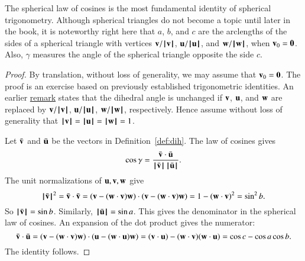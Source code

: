 The spherical law of cosines is the most fundamental identity of spherical trigonometry.    Although  spherical
triangles do not become a topic until later in the book, it is noteworthy right here that $a$, $b$, and $c$ are
the arclengths of the sides of a spherical triangle with
vertices $\v/\normo{\v}$, $\u/\normo{\u}$, and $\w/\normo{\w}$,  when $\v_0=\orz$.  Also,
$\gamma$ measures the angle of the spherical triangle opposite the
side $c$.
%
%


\begin{proof}  By translation, without loss of generality, we may assume that $\v_0=\orz$.  
The proof is an exercise based on previously established trigonometric identities.
An earlier \hyperref[rem:dih]{remark} states that the
dihedral angle is unchanged if $\v$, $\u$, and $\w$ are replaced
by $\v/\normo{\v}$, $\u/\normo{\u}$, $\w/\normo{\w}$, respectively.  Hence assume without
loss of generality that $\normo{\v}=\normo{\u}=\normo{\w}=1$.

Let $\bar \v$ and $\bar \u$ be the vectors in Definition~\ref{def:dih}.
The law of cosines gives
        $$\cos\gamma = \frac{\bar \v\cdot \bar \u}{\normo{\bar \v}\,\normo{\bar \u}}.$$
The unit normalizations of $\u,\v,\w$ give
        $$
        \normo{\bar \v}^2 = \bar \v\cdot \bar \v =
        (\v - (\w\cdot \v)\w)\cdot (\v - (\w\cdot \v) \w) =
        1 - (\w\cdot \v)^2 = \sin^2 b.
        $$
So $\normo{\bar \v} =\sin b$. Similarly, $\normo{\bar \u} = \sin a$.  This gives
the denominator in the spherical law of cosines.  An expansion of the dot product
gives the numerator:
    $$
    \bar \v\cdot \bar \u = (\v - (\w\cdot \v) \w)\cdot (\u - (\w\cdot \u) \w)
    = (\v\cdot \u) - (\w\cdot \v) (\w\cdot \u) = \cos c - \cos
    a \cos b.
    $$
The identity follows.
\end{proof}

